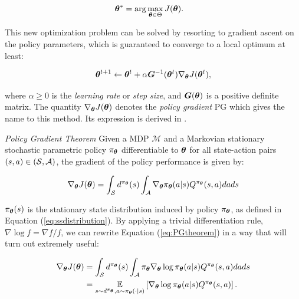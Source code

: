 \begin{align}
\boldsymbol{\theta}^* &= \arg \max_{\boldsymbol{\theta}\in\Theta}J(\boldsymbol{\theta}).
\end{align}

This new optimization problem can be solved by resorting to gradient ascent on the policy parameters, which is guaranteed to converge to a local optimum at least:

\begin{align}
\boldsymbol{\theta}^{t+1} \leftarrow \boldsymbol{\theta}^t+\alpha\boldsymbol{G}^{-1}(\boldsymbol{\theta}^t)\nabla_{\boldsymbol{\theta}}J(\boldsymbol{\theta}^t), \label{eq:paramsupdate}
\end{align}

where $\alpha\geq 0$ is the \emph{learning rate} or \emph{step size}, and $\boldsymbol{G}(\boldsymbol{\theta})$ is a positive definite matrix. The quantity $\nabla_{\boldsymbol{\theta}}J(\boldsymbol{\theta})$ denotes the \emph{policy gradient} \gls{PG} which gives the name to this method. Its expression is derived in \cite{sutton2000policy}.

\begin{theorem} \label{th:PGtheorem}
\emph{Policy Gradient Theorem} Given a \gls{MDP} $\mathcal{M}$ and a  Markovian stationary stochastic parametric policy $\pi_{\boldsymbol{\theta}}$ differentiable \wrt to $\boldsymbol{\theta}$ for all state-action pairs $(s,a)\in(\mathcal{S},\mathcal{A})$, the gradient of the policy performance is given by:

\begin{equation}
\nabla_{\boldsymbol{\theta}}J(\boldsymbol{\theta}) 
= \int_{\mathcal{S}}d^{\pi_{\boldsymbol{\theta}}}(s)\int_{\mathcal{A}}\nabla_{\boldsymbol{\theta}}\pi_{\boldsymbol{\theta}}(a|s)Q^{\pi_{\boldsymbol{\theta}}}(s,a)dads \nonumber \label{eq:PGtheorem}
\end{equation}
\end{theorem}

$\pi_{\boldsymbol{\theta}}(s)$ is the stationary state distribution induced by policy $\pi_{\boldsymbol{\theta}}$, as defined in Equation (\ref{eq:ssdistribution}). By applying a trivial differentiation rule, $\nabla\log f=\nabla f/f$, we can rewrite Equation (\ref{eq:PGtheorem}) in a way that will turn out extremely useful:

\begin{align}
\nabla_{\boldsymbol{\theta}}J(\boldsymbol{\theta}) 
&= \int_{\mathcal{S}}d^{\pi_{\boldsymbol{\theta}}}(s)\int_{\mathcal{A}}\pi_{\boldsymbol{\theta}}\nabla_{\boldsymbol{\theta}}\log\pi_{\boldsymbol{\theta}}(a|s)Q^{\pi_{\boldsymbol{\theta}}}(s,a)dads \nonumber \\
&= \underset{s\sim d^{\pi_{\boldsymbol{\theta}}}, a\sim \pi_{\boldsymbol{\theta}}(\cdot|s)}{\mathbb{E}}\left[{\nabla_{\boldsymbol{\theta}}\log\pi_{\boldsymbol{\theta}}(a|s)Q^{\pi_{\boldsymbol{\theta}}}(s,a)}\right] . \label{eq:reinforcetrick} 
\end{align}

